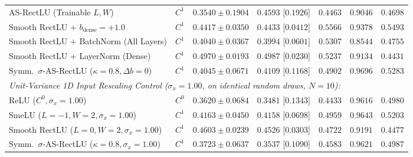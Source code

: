 \documentclass[11pt, a4paper]{article}
\begin{document}
\begin{table}[!htbp]
{\begin{tabular}{l l c c c c c}
\rowcolor{alertred}
AS-RectLU (Trainable $L, W$) & $C^{1}$ & $0.3540 \pm 0.1904$ & $0.4593$ [$0.1926$] & $0.4463$ & $0.9046$ & $0.4698$ \\
Smooth RectLU + $b_{\text{dense}}=+1.0$ & $C^{1}$ & $0.4417 \pm 0.0350$ & $0.4433$ [$0.0412$] & \textbf{$0.5566$} & $0.9378$ & $0.5493$ \\
Smooth RectLU + BatchNorm (All Layers) & $C^{1}$ & $0.4040 \pm 0.0367$ & $0.3994$ [$0.0601$] & $0.5307$ & $0.8544$ & $0.4755$ \\
Smooth RectLU + LayerNorm (Dense) & $C^{1}$ & $0.4970 \pm 0.0193$ & $0.4987$ [$0.0230$] & $0.5237$ & $0.9134$ & $0.4431$ \\
\rowcolor{goodgreen}
Symm.\ $\sigma$-AS-RectLU ($\kappa=0.8, \Delta b=0$) & $C^{1}$ & $0.4045 \pm 0.0671$ & $0.4109$ [$0.1168$] & $0.4902$ & $0.9696$ & $0.5283$ \\
\midrule
\multicolumn{7}{l}{\textit{Unit-Variance 1D Input Rescaling Control ($\sigma_{x} = 1.00$, on identical random draws, $N=10$):}} \\
ReLU ($C^{0}, \sigma_{x}=1.00$) & $C^{0}$ & $0.3620 \pm 0.0684$ & $0.3481$ [$0.1343$] & $0.4433$ & $0.9616$ & $0.4980$ \\
SmeLU ($L=-1, W=2, \sigma_{x}=1.00$) & $C^{1}$ & $0.4163 \pm 0.0450$ & $0.4158$ [$0.0698$] & \textbf{$0.4959$} & \textbf{$0.9643$} & \textbf{$0.5203$} \\
Smooth RectLU ($L=0, W=2, \sigma_{x}=1.00$) & $C^{1}$ & \textbf{$0.4603 \pm 0.0239$} & \textbf{$0.4526$} [$0.0303$] & $0.4722$ & $0.9191$ & $0.4477$ \\
\rowcolor{goodgreen}
Symm.\ $\sigma$-AS-RectLU ($\kappa=0.8, \sigma_{x}=1.00$) & $C^{1}$ & $0.3723 \pm 0.0637$ & $0.3537$ [$0.1090$] & $0.4583$ & $0.9621$ & $0.4987$ \\
\bottomrule
\end{tabular}%
}
\end{table}
\end{document}
